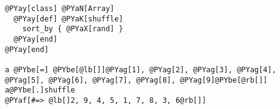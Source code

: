 \begin{Verbatim}[commandchars=@\[\]]
@PYay[class] @PYaN[Array]
  @PYay[def] @PYaK[shuffle]
    sort_by { @PYaX[rand] }
  @PYay[end]
@PYay[end]

a @PYbe[=] @PYbe[@lb[]]@PYag[1], @PYag[2], @PYag[3], @PYag[4], @PYag[5], @PYag[6], @PYag[7], @PYag[8], @PYag[9]@PYbe[@rb[]]
a@PYbe[.]shuffle
@PYaf[#=> @lb[]2, 9, 4, 5, 1, 7, 8, 3, 6@rb[]]
\end{Verbatim}
